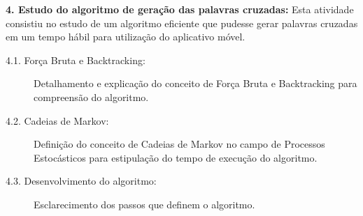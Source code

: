\begin{description}

\item \textbf{4. Estudo do algoritmo de geração das palavras cruzadas:}
Esta atividade consistiu no estudo de um algoritmo eficiente que pudesse gerar palavras cruzadas em um tempo hábil para utilização do aplicativo móvel.
 

\begin{description}
\item[4.1. Força Bruta e Backtracking:] Detalhamento e explicação do conceito de Força Bruta e Backtracking para compreensão do algoritmo.

\item[4.2. Cadeias de Markov:] Definição do conceito de Cadeias de Markov no campo de Processos Estocásticos para estipulação do tempo de execução do algoritmo.

\item[4.3. Desenvolvimento do algoritmo:] Esclarecimento dos passos que definem o algoritmo.

\end{description}

\end{description}